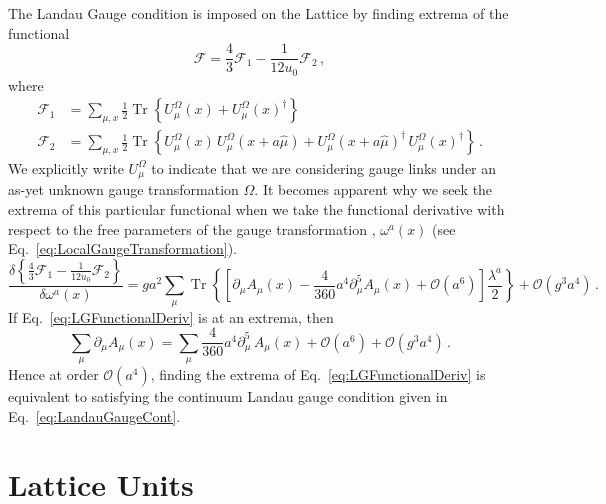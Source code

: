 The Landau Gauge condition is imposed on the Lattice by finding extrema of the functional~\cite{Bonnet:1999mj}
%
\begin{equation}
\mathcal{F} =  \frac{4}{3}\mathcal{F}_1 - \frac{1}{12u_0}\mathcal{F}_2\, ,
\label{eq:LGFunctional}
\end{equation}
%
where
%
\begin{align*}
\mathcal{F}_1 &= \sum _ { \mu , x } \frac { 1 } { 2 } \operatorname { Tr } \left\{ U _ { \mu } ^ { \Omega } ( x ) + U _ { \mu } ^ { \Omega } ( x ) ^ { \dagger } \right\}\\
\mathcal{F}_2 &= \sum _ { \mu , x } \frac { 1 } { 2 } \operatorname { Tr } \left\{ U _ { \mu } ^ { \Omega } ( x ) \,U _ { \mu } ^ { \Omega } ( x + a\hat { \mu } ) + U _ { \mu } ^ { \Omega } ( x + a\hat { \mu } )^\dagger\, U _ { \mu } ^ { \Omega } ( x )^\dagger  \right\}\, .
\end{align*}
%
We explicitly write $U^\Omega_\mu$ to indicate that we are considering gauge links under an as-yet unknown gauge transformation $\Omega$. It becomes apparent why we seek the extrema of this particular functional when we take the functional derivative with respect to the free parameters of the gauge transformation , $\omega^a(x)$ (see Eq.~\ref{eq:LocalGaugeTransformation}).
%
\begin{equation}
\frac { \delta \left\{ \frac { 4 } { 3 } \mathcal { F } _ { 1 } - \frac { 1 } { 12 u _ { 0 } } \mathcal { F } _ { 2 } \right\} } { \delta \omega ^ { a } ( x ) } = g a ^ { 2 } \sum _ { \mu } \operatorname { Tr } \left\{ \left[ \partial _ { \mu } A _ { \mu } ( x ) - \frac { 4 } { 360 } a ^ { 4 } \partial _ { \mu } ^ { 5 } A _ { \mu } ( x ) + \mathcal { O } \left( a ^ { 6 } \right) \right] \frac{\lambda^a}{2} \right\} + \mathcal { O } \left( g ^ { 3 } a ^ { 4 } \right)\, .
\label{eq:LGFunctionalDeriv}
\end{equation}
%
If Eq.~\ref{eq:LGFunctionalDeriv} is at an extrema, then 
%
\begin{equation*}
\sum_\mu \partial_\mu A_\mu(x) = \sum_\mu \frac{4}{360}a^4 \partial_\mu^5\,A_\mu(x) + \mathcal{O}(a^6)+\mathcal{O}(g^3a^4)\, .
\end{equation*}
%
Hence at order $\mathcal{O}(a^4)$, finding the extrema of Eq.~\ref{eq:LGFunctionalDeriv} is equivalent to satisfying the continuum Landau gauge condition given in Eq.~\ref{eq:LandauGaugeCont}.

\section{Lattice Units}

